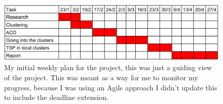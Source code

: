 \begin{figure}[h]
    \centering
    \includegraphics[width=\textwidth]{figures/initial_weekly_plan.png}
    \caption{My initial weekly plan for the project, this was just a guiding view of the project. This was meant as a way for me to monitor my progress, because I was using an Agile approach I didn't update this to include the deadline extension.}
    \label{fig:initial_weekly_plan}
\end{figure}